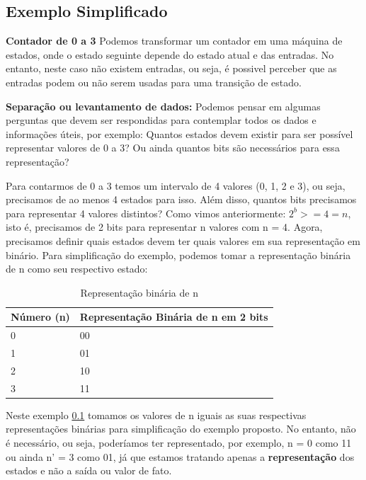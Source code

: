 \documentclass[12pt]{article}
\begin{document}
\subsection{Exemplo Simplificado}
\label{Exemplo}

\textbf{Contador de 0 a 3}
Podemos transformar um contador em uma máquina de estados, onde o estado seguinte depende do estado atual e das entradas. No entanto, neste caso não existem entradas, ou seja, é possivel perceber que as entradas podem ou não serem usadas para uma transição de estado.


\textbf{Separação ou levantamento de dados:}
Podemos pensar em algumas perguntas que devem ser respondidas para contemplar todos os dados e informações úteis, por exemplo:
Quantos estados devem existir para ser possível representar valores de 0 a 3? Ou ainda quantos bits são necessários para essa representação?

Para contarmos de 0 a 3 temos um intervalo de 4 valores (0, 1, 2 e 3), ou seja, precisamos de ao menos 4 estados para isso. Além disso, quantos bits precisamos para representar 4 valores distintos? Como vimos anteriormente: $2^b >= 4 = n $, isto é, precisamos de 2 bits para representar n valores com n = 4. Agora, precisamos  definir quais estados devem ter quais valores em sua representação em binário. Para simplificação do exemplo, podemos tomar a representação binária de n como seu respectivo estado: 

\begin{table}[H]
    \centering
    \begin{tabular}{|p{2cm}|p{6cm}|}
    \hline
    Número (n) & Representação Binária de n em 2 bits \\
    \hline
    0     & 00 \\
    1     & 01 \\
    2     & 10 \\
    3     & 11 \\
    \hline
    \end{tabular}
    \caption{Representação binária de n}
    \label{tab:rep_bin}
\end{table}

\begin{tcolorbox}[mynote, title=Nota: representação dos estados] 
Neste exemplo \ref{Exemplo} tomamos os valores de n iguais as suas respectivas representações binárias para simplificação do exemplo proposto. No entanto, não é necessário, ou seja, poderíamos ter representado, por exemplo, n = 0 como 11 ou ainda n' = 3 como 01, já que estamos tratando apenas a  \textbf{representação} dos estados e não a saída ou valor de fato.  
\end{tcolorbox} 
\end{document}
